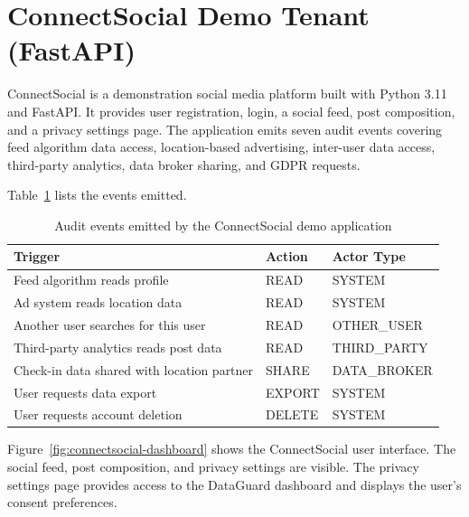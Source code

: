 \documentclass[a4paper,12pt,onecolumn]{report}
\begin{document}
\section{ConnectSocial Demo Tenant (FastAPI)}

ConnectSocial is a demonstration social media platform built with Python 3.11 and FastAPI.
It provides user registration, login, a social feed, post composition, and a privacy settings page.
The application emits seven audit events covering feed algorithm data access, location-based advertising, inter-user data access, third-party analytics, data broker sharing, and GDPR requests.

Table~\ref{tab:social-events} lists the events emitted.

\begin{table}[h]
    \begin{center}
        \begin{tabular}{|p{6cm}|l|l|}
            \hline
            \textbf{Trigger} & \textbf{Action} & \textbf{Actor Type} \\
            \hline
            Feed algorithm reads profile & READ & SYSTEM \\
            \hline
            Ad system reads location data & READ & SYSTEM \\
            \hline
            Another user searches for this user & READ & OTHER\_USER \\
            \hline
            Third-party analytics reads post data & READ & THIRD\_PARTY \\
            \hline
            Check-in data shared with location partner & SHARE & DATA\_BROKER \\
            \hline
            User requests data export & EXPORT & SYSTEM \\
            \hline
            User requests account deletion & DELETE & SYSTEM \\
            \hline
        \end{tabular}
    \end{center}
    \caption{Audit events emitted by the ConnectSocial demo application}
    \label{tab:social-events}
\end{table}

Figure~\ref{fig:connectsocial-dashboard} shows the ConnectSocial user interface.
The social feed, post composition, and privacy settings are visible.
The privacy settings page provides access to the DataGuard dashboard and displays the user's consent preferences.
\end{document}
